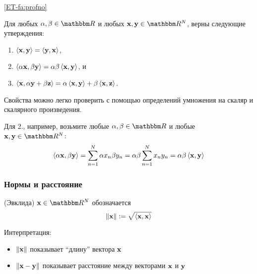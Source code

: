 \begin{frame}

    \vspace{2em}
    \Fact \eqref{ET-fa:profno}
    
    Для любых $\alpha, \beta \in \RR$ и любых $\boldx, \boldy \in \RR^N$, верны следующие утверждения:
    \begin{enumerate}
        \item $\left\langle{ {\mathbf x} ,  {\mathbf y} }\right\rangle = \left\langle{ {\mathbf y} ,  {\mathbf x} }\right\rangle$,
        \item $\left\langle{\alpha  {\mathbf x} , \beta  {\mathbf y} }\right\rangle =  \alpha \beta
            \left\langle{ {\mathbf x} ,  {\mathbf y} }\right\rangle$, и
        \item $\left\langle{ {\mathbf x} , \alpha  {\mathbf y} + \beta  {\mathbf z} }\right\rangle =  \alpha
            \left\langle{ {\mathbf x} ,  {\mathbf y} }\right\rangle + \beta \left\langle{ {\mathbf x} ,  {\mathbf z} }\right\rangle$.
    \end{enumerate}
    
    \vspace{1em}
    Свойства можно легко проверить с помощью определений умножения на скаляр и скалярного произведения.

    Для 2., например, возьмите любые $\alpha, \beta \in \RR$ и любые $\boldx, \boldy \in
    \RR^N$:
    \begin{equation*}
        \left\langle{\alpha  {\mathbf x} , \beta  {\mathbf y} }\right\rangle
        = \sum_{n=1}^N \alpha x_n \beta y_n
        = \alpha \beta \sum_{n=1}^N x_n y_n 
        = \alpha \beta \left\langle{ {\mathbf x} ,  {\mathbf y} }\right\rangle
    \end{equation*}

\end{frame}

\begin{frame}
    \frametitle{Нормы и расстояние}
    
     \vspace{2em}
     (Эвклида) $\boldx \in \RR^N$ обозначается
    \begin{equation*}
        \label{eq:eucnorm}
        \| {\mathbf x} \| := \sqrt{\left\langle{ {\mathbf x} ,  {\mathbf x} }\right\rangle} 
    \end{equation*}
    
    \vspace{.7em}
    Интерпретация:
    \begin{itemize}
        \item $\| {\mathbf x} \|$ показывает ``длину'' вектора ${\mathbf x}$
            \vspace{0.5em}
        \item $\| {\mathbf x} - {\mathbf y} \|$ показывает расстояние между векторами ${\mathbf x}$ и ${\mathbf y}$
    \end{itemize}

\end{frame}

